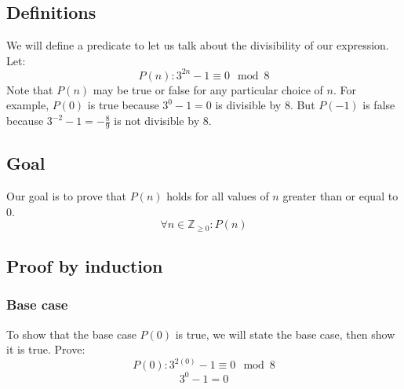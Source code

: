 \documentclass{article}
\begin{document}
\subsection{Definitions}
We will define a predicate to let us talk about the divisibility of our expression. Let:
\begin{equation}
P(n): 3^{2n} - 1 \equiv 0 \mod 8
\end{equation}
Note that $P(n)$ may be true or false for any particular choice of $n$. For example, $P(0)$ is true because $3^0 - 1 = 0$ is divisible by 8. But $P(-1)$ is false because $3^{-2} - 1 = -\frac{8}{9}$ is not divisible by 8.

\subsection{Goal}
Our goal is to prove that $P(n)$ holds for all values of $n$ greater than or equal to 0.
\begin{equation}
\forall n \in \mathbb Z_{\ge 0} : P(n)
\end{equation}

\subsection{Proof by induction}
\subsubsection{Base case}
To show that the base case $P(0)$ is true, we will state the base case, then show it is true. Prove:
\begin{equation}
P(0): 3^{2(0)} - 1 \equiv 0 \mod 8
\end{equation}
\[ 3^0 - 1 = 0 \]
\end{document}
